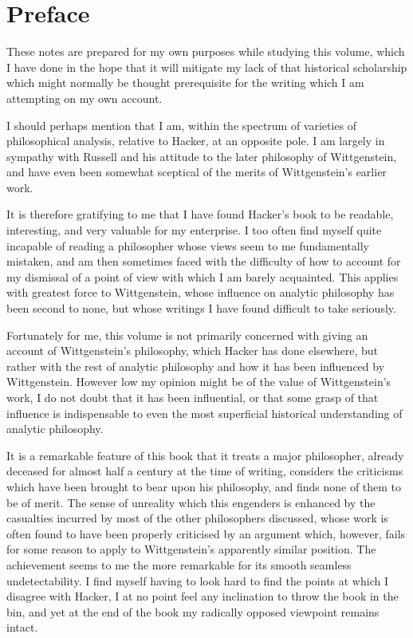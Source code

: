 \chapter*{Preface}

These notes are prepared for my own purposes while studying this volume, which I have done in the hope that it will mitigate my lack of that historical scholarship which might normally be thought prerequisite for the writing which I am attempting on my own account.

I should perhaps mention that I am, within the spectrum of varieties of philosophical analysis, relative to Hacker, at an opposite pole.
I am largely in sympathy with Russell and his attitude to the later philosophy of Wittgenstein, and have even been somewhat sceptical of the merits of Wittgenstein's earlier work.

It is therefore gratifying to me that I have found Hacker's book to be readable, interesting, and very valuable for my enterprise.
I too often find myself quite incapable of reading a philosopher whose views seem to me fundamentally mistaken, and am then sometimes faced with the difficulty of how to account for my dismissal of a point of view with which I am barely acquainted.
This applies with greatest force to Wittgenstein, whose influence on analytic philosophy has been second to none, but whose writings I have found difficult to take seriously.

Fortunately for me, this volume is not primarily concerned with giving an account of Wittgenstein's philosophy, which Hacker has done elsewhere, but rather with the rest of analytic philosophy and how it has been influenced by Wittgenstein.
However low my opinion might be of the value of Wittgenstein's work, I do not doubt that it has been influential, or that some grasp of that influence is indispensable to even the most superficial historical understanding of analytic philosophy.

It is a remarkable feature of this book that it treats a major philosopher, already deceased for almost half a century at the time of writing, considers the criticisms which have been brought to bear upon his philosophy, and finds none of them to be of merit.
The sense of unreality which this engenders is enhanced by the casualties incurred by most of the other philosophers discussed, whose work is often found to have been properly criticised by an argument which, however, fails for some reason to apply to Wittgenstein's apparently similar position.
The achievement seems to me the more remarkable for its smooth seamless undetectability.
I find myself having to look hard to find the points at which I disagree with Hacker, I at no point feel any inclination to throw the book in the bin, and yet at the end of the book my radically opposed viewpoint remains intact.


